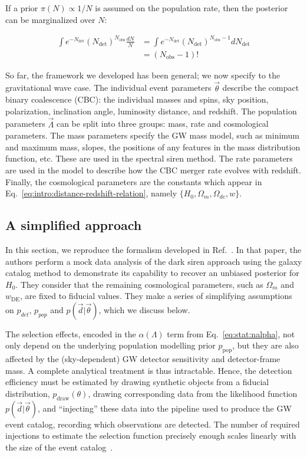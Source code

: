 \documentclass[%
preprint,
nofootinbib,
 amsmath,amssymb,
 aps,
]{revtex4-2}
\newcommand{\given}[2]{p( #1 | #2 )}
\newcommand{\ppop}[0]{p_{\text{pop}}}
\newcommand{\ndet}[0]{N_{\text{det}}}
\newcommand{\nobs}[0]{N_{\text{obs}}}
\begin{document}
If a prior $\pi(N) \propto 1/N$ is assumed on the population rate, then the posterior can be
marginalized over $N$:

\begin{align}
	\int e^{-\ndet}(\ndet)^{\nobs} \frac{dN}{N} & = \int e^{-\ndet}(\ndet)^{\nobs - 1} d\ndet \\
	                                            & = (\nobs - 1)!
\end{align}

So far, the framework we developed has been general; we now specify to the gravitational wave case.
The individual event parameters $\vec{\theta}$ describe the compact binary coalescence (CBC): the
individual masses and spins, sky position, polarization, inclination angle, luminosity distance,
and redshift. The population parameters $\vec{\Lambda}$ can be split into three groups: mass, rate
and cosmological parameters. The mass parameters specify the GW mass model, such as minimum and
maximum mass, slopes, the positions of any features in the mass distribution function, etc. These
are used in the spectral siren method. The rate parameters are used in the model to describe how
the CBC merger rate evolves with redshift. Finally, the cosmological parameters are the constants
which appear in Eq.~\eqref{eq:intro:distance-redshift-relation}, namely $\{H_0, \Omega_m,
	\Omega_{de}, w\}$.

\subsection{A simplified approach}
\label{sec:stat:simplified}

In this section, we reproduce the formalism developed in Ref.~. In that
paper, the authors perform a mock data analysis of the dark siren approach using the galaxy catalog
method to demonstrate its capability to recover an unbiased posterior for $H_0$. They consider that
the remaining cosmological parameters, such as $\Omega_m$ and $w_\text{DE}$, are fixed to fiducial
values. They make a series of simplifying assumptions on $p_{det}$, $p_{pop}$ and
$\given{\vec{d}}{\vec{\theta}}$, which we discuss below.

The selection effects, encoded in the $\alpha (\Lambda )$ term from Eq.~\eqref{eq:stat:nalpha}, not
only depend on the underlying population modelling prior $\ppop$, but they are also affected by the
(sky-dependent) GW detector sensitivity and detector-frame mass. A complete analytical treatment is
thus intractable. Hence, the detection efficiency must be estimated by drawing synthetic objects
from a fiducial distribution, $p_\text{draw}(\theta)$, drawing corresponding data from the
likelihood function $\given{\vec{d}}{\vec{\theta}}$, and “injecting” these data into the pipeline
used to produce the GW event catalog, recording which observations are detected. The number of
required injections to estimate the selection function precisely enough scales linearly with the
size of the event catalog~\cite{essick2022precision}.
\end{document}
